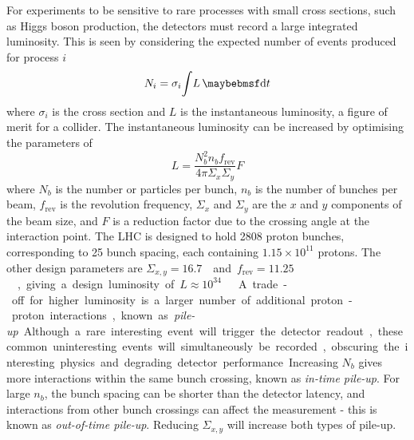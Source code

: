 For experiments to be sensitive to rare processes with small cross sections, such as Higgs 
boson production, the detectors must record a large integrated luminosity. This is seen by 
considering the expected number of events produced for process $i$
\begin{equation}
	N_i = \sigma_i \! \int \! L \, \d{t}
	\label{eq:event_rate}
\end{equation}
where $\sigma_i$ is the cross section and $L$ is the instantaneous luminosity, a figure of 
merit for a collider. The instantaneous luminosity can be increased by optimising the
parameters of
\begin{equation}
	L = \frac{N_b^2 n_b f_{\text{rev}}}{4\pi \varSigma_x \varSigma_y} F
	\label{eq:lumi_beam}
\end{equation}
where $N_b$ is the number or particles per bunch, $n_b$ is the number of bunches per beam, 
$f_{\text{rev}}$ is the revolution frequency, $\varSigma_x$ and $\varSigma_y$ are the $x$ 
and $y$ components of the beam size, and $F$ is a reduction factor due to the crossing 
angle at the interaction point. The \ac{LHC} is designed to hold 2808 proton bunches, 
corresponding to \unit{25}{\nano\second} bunch spacing, each containing $1.15\times10^{11}$
protons. The other design parameters are \unit{$\varSigma_{x,y} = 16.7$}{\micro\metre} 
and \unit{$f_{\text{rev}} = 11.25$}{\kHz}, giving a design luminosity of 
\unit{$L \approx 10^{34}$}{\lumiunits} \cite{LHC}.

A trade-off for higher luminosity is a larger number of additional proton-proton 
interactions, known as \textit{pile-up}. Although a rare interesting event will trigger 
the detector readout, these common uninteresting events will simultaneously be recorded, 
obscuring the interesting physics and degrading detector performance. Increasing $N_b$ 
gives more interactions within the same bunch crossing, known as \textit{in-time pile-up}. 
For large $n_b$, the bunch spacing can be shorter than the detector latency, and 
interactions from other bunch crossings can affect the measurement - this is known as 
\textit{out-of-time pile-up}. Reducing $\varSigma_{x,y}$ will increase both types of 
pile-up.
